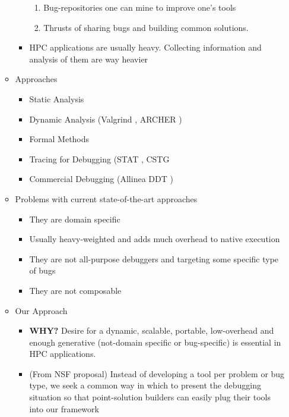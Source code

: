 \begin{itemize}
\begin{itemize}
\begin{itemize}
\begin{enumerate}
			\item Bug-repositories one can mine to improve one’s tools
			\item Thrusts of sharing bugs and building common solutions.				
			\end{enumerate}
		\item HPC applications are usually heavy. Collecting information and analysis of them are way heavier		 
		\end{itemize}
	\item Approaches
		\begin{itemize}
		\item Static Analysis
		\item Dynamic Analysis (Valgrind \cite{valgrind}, ARCHER \cite{archer})
		\item Formal Methods
		\item Tracing for Debugging (STAT \cite{stat}, CSTG \cite{cstg}
		\item Commercial Debugging (Allinea DDT \cite{ddt})
		\end{itemize}
	\item Problems with current state-of-the-art approaches
		\begin{itemize}
		\item They are domain specific
		\item Usually heavy-weighted and adds much overhead to native execution
		\item They are not all-purpose debuggers and targeting some specific type of bugs
		\item They are not composable
		\end{itemize}
	\item Our Approach
		\begin{itemize}
		\item \textbf{WHY?} Desire for a dynamic, scalable, portable, low-overhead and enough generative (not-domain specific or bug-specific) is essential in HPC applications.
		\item (From NSF proposal) Instead of developing a tool per problem or bug type, we seek a common way in which to present the debugging situation so that point-solution builders can easily plug their tools into our framework

\end{itemize}
\end{itemize}
\end{itemize}
